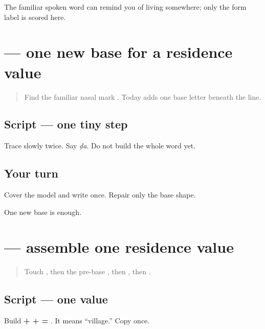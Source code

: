 \begin{tcolorbox}[breakable,colback=teal!4,colframe=teal!35!black,title={Before you move on}]
The familiar spoken word \textbf{} can remind you of living somewhere; only the form label is scored here.
\end{tcolorbox}
\section[\texorpdfstring{\pa{ਡ} (ḍa)}{ਡ (ḍa)}]{ — one new base for a residence value}

\label{lesson:PA-W04-dda}



\begin{quote}
Find the familiar nasal mark \textbf{}. Today adds one base letter beneath the line.
\end{quote}

\subsection*{Script — one tiny step}

Trace \textbf{} slowly twice. Say \emph{ḍa}. Do not build the whole word yet.

\subsection*{Your turn}
Cover the model and write \textbf{} once. Repair only the base shape.

\begin{tcolorbox}[breakable,colback=teal!4,colframe=teal!35!black,title={Before you move on}]
One new base is enough.
\end{tcolorbox}
\section[\texorpdfstring{\pa{ਪਿੰਡ} (piṇḍ)}{ਪਿੰਡ (piṇḍ)}]{ — assemble one residence value}

\label{lesson:PA-W04-village}



\begin{quote}
Touch \textbf{}, then the pre-base \textbf{}, then \textbf{}, then \textbf{}.
\end{quote}

\subsection*{Script — one value}
Build \textbf{ +  +  = }. It means “village.” Copy \textbf{} once.

